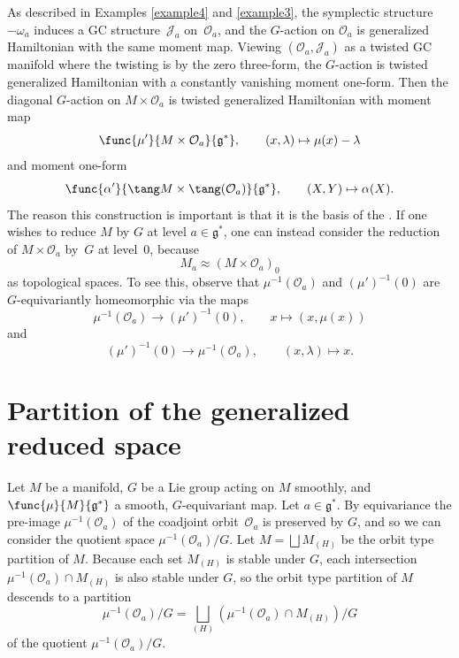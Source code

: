 As described in Examples \ref{example4} and \ref{example3}, the symplectic structure $-\omega_{a}$ induces a GC structure~$\mathcal{J}_{a}$ on~$\mathcal{O}_{a}$, and the $G$-action on $\mathcal{O}_{a}$ is generalized Hamiltonian with the same moment map.  Viewing $(\mathcal{O}_{a},\mathcal{J}_{a})$ as a twisted GC manifold where the twisting is by the zero three-form, the $G$-action is twisted generalized Hamiltonian with a constantly vanishing moment one-form.  Then the diagonal $G$-action on $M \times \mathcal{O}_{a}$ is twisted generalized Hamiltonian with moment map
\[
  \func{\mu'}{M \times \mathcal{O}_{a}}{\mathfrak{g}^*},
  \qquad (x,\lambda) \mapsto \mu(x) - \lambda
\]
and moment one-form
\[
  \func{\alpha'}{
  \tang M \times \tang (\mathcal{O}_{a})}{
  \mathfrak{g}^*},
  \qquad
  (X,Y) \mapsto \alpha(X).
\]
The reason this construction is important is that it is the basis of the .  If one wishes to reduce $M$ by $G$ at level $a \in \mathfrak{g}^*$, one can instead consider the reduction of $M \times \mathcal{O}_{a}$ by~$G$ at level~$0$, because
\[
  M_a \approx (M \times \mathcal{O}_{a})_0
\]
as topological spaces.
To see this, observe that $\mu^{-1}(\mathcal{O}_a)$ and $(\mu')^{-1}(0)$ are $G$-equivariantly homeomorphic via the maps
\[
  \mu^{-1}(\mathcal{O}_a) \to (\mu')^{-1}(0),
  \qquad
  x \mapsto \left(x, \mu(x) \right)
\]
and
\[
  (\mu')^{-1}(0) \to \mu^{-1}(\mathcal{O}_a),
  \qquad
  (x, \lambda) \mapsto x.
\]


\section{Partition of the generalized reduced space}\label{section4}


Let $M$ be a manifold, $G$ be a Lie group acting on $M$ smoothly, and $\func{\mu}{M}{\mathfrak{g}^*}$ a smooth, $G$-equivariant map.
Let $a \in \mathfrak{g}^*$.
By equivariance the pre-image $\mu^{-1}(\mathcal{O}_a)$ of the coadjoint orbit~$\mathcal{O}_a$ is preserved by $G$, and so we can consider the quotient space $\mu^{-1}(\mathcal{O}_a) / G$.
Let $M = \bigsqcup M_{(H)}$ be the orbit type partition of $M$.
Because each set $M_{(H)}$ is stable under $G$, each intersection $\mu^{-1}(\mathcal{O}_a) \cap M_{(H)}$ is also stable under $G$,
so the orbit type partition of $M$ descends to a partition
\[
  \mu^{-1}(\mathcal{O}_a) / G
  = \bigsqcup_{(H)} \left( \mu^{-1}(\mathcal{O}_a) \cap M_{(H)} \right) / G
\]
of the quotient $\mu^{-1}(\mathcal{O}_a) / G$.


